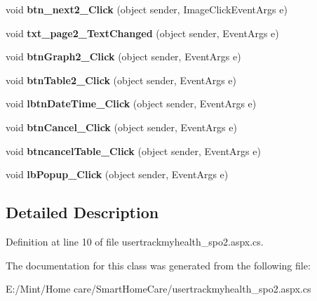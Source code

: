\begin{DoxyCompactItemize}
\item 
\hypertarget{classusertrackmyhealth__spo2_a5d5c0ea62937e759fd5069179003ae24}{void {\bfseries btn\-\_\-next2\-\_\-\-Click} (object sender, Image\-Click\-Event\-Args e)}\label{classusertrackmyhealth__spo2_a5d5c0ea62937e759fd5069179003ae24}

\item 
\hypertarget{classusertrackmyhealth__spo2_a5e5bcee8f6932e370e7569160b497010}{void {\bfseries txt\-\_\-page2\-\_\-\-Text\-Changed} (object sender, Event\-Args e)}\label{classusertrackmyhealth__spo2_a5e5bcee8f6932e370e7569160b497010}

\item 
\hypertarget{classusertrackmyhealth__spo2_adad2ea9b9799f7a14192229e2be49f5a}{void {\bfseries btn\-Graph2\-\_\-\-Click} (object sender, Event\-Args e)}\label{classusertrackmyhealth__spo2_adad2ea9b9799f7a14192229e2be49f5a}

\item 
\hypertarget{classusertrackmyhealth__spo2_ad57ab7708cdb76d12a3da7ec489cb83d}{void {\bfseries btn\-Table2\-\_\-\-Click} (object sender, Event\-Args e)}\label{classusertrackmyhealth__spo2_ad57ab7708cdb76d12a3da7ec489cb83d}

\item 
\hypertarget{classusertrackmyhealth__spo2_ad1a66d3eee653f9afe01c1639d9834b5}{void {\bfseries lbtn\-Date\-Time\-\_\-\-Click} (object sender, Event\-Args e)}\label{classusertrackmyhealth__spo2_ad1a66d3eee653f9afe01c1639d9834b5}

\item 
\hypertarget{classusertrackmyhealth__spo2_adcaa7baa9226f0e93d37a1a18e2ae649}{void {\bfseries btn\-Cancel\-\_\-\-Click} (object sender, Event\-Args e)}\label{classusertrackmyhealth__spo2_adcaa7baa9226f0e93d37a1a18e2ae649}

\item 
\hypertarget{classusertrackmyhealth__spo2_a88553ee81ba5754c0556cbda61a02ee5}{void {\bfseries btncancel\-Table\-\_\-\-Click} (object sender, Event\-Args e)}\label{classusertrackmyhealth__spo2_a88553ee81ba5754c0556cbda61a02ee5}

\item 
\hypertarget{classusertrackmyhealth__spo2_a1ea382e16ce2acc6fab95dae7e84ab50}{void {\bfseries lb\-Popup\-\_\-\-Click} (object sender, Event\-Args e)}\label{classusertrackmyhealth__spo2_a1ea382e16ce2acc6fab95dae7e84ab50}

\end{DoxyCompactItemize}


\subsection{Detailed Description}


Definition at line 10 of file usertrackmyhealth\-\_\-spo2.\-aspx.\-cs.



The documentation for this class was generated from the following file\-:\begin{DoxyCompactItemize}
\item 
E\-:/\-Mint/\-Home care/\-Smart\-Home\-Care/usertrackmyhealth\-\_\-spo2.\-aspx.\-cs\end{DoxyCompactItemize}
